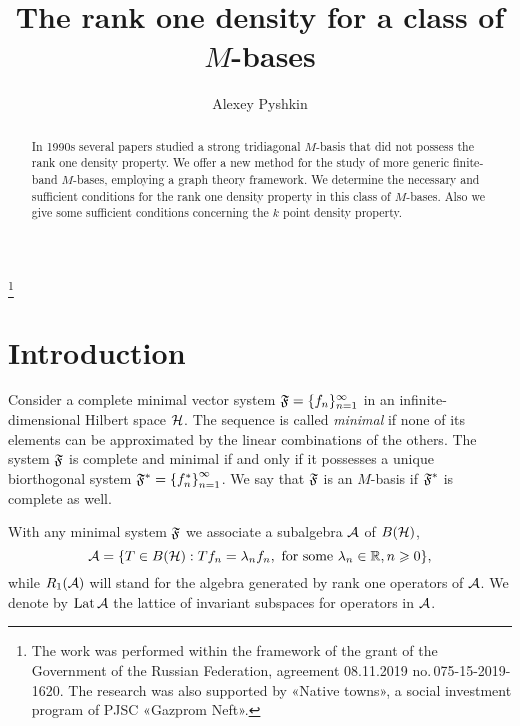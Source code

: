 \documentclass[12pt,oneside,a4paper]{amsart}
\begin{document}
\title{The rank one density for a class of $M$-bases}
\author{Alexey Pyshkin}
\address{Chebyshev Laboratory, Saint Petersburg State University, 14th Line V.O. 29, Saint Petersburg 199178, Russia}
\address{Saint Petersburg Department of RAS, Steklov Math. Institute, Fontanka 27, Saint Petersburg 191023, Russia}
\address{Euler International Mathematical Institute, nab.\,Pesochnaya 10, Saint Petersburg 197022, Russia}


\begin{abstract}
  In 1990s several papers studied a strong tridiagonal $M$-basis
    that did not possess the rank one density property.
  We offer a new method for the study of more generic finite-band $M$-bases,
    employing a graph theory framework.
  We determine the necessary and sufficient conditions for the rank one density property
    in this class of $M$-bases.
  Also we give some sufficient conditions concerning the $k$ point density property.
\end{abstract}
\thanks{
        The work was performed within the framework of the grant of the Government
          of the Russian Federation, agreement 08.11.2019 no.\,075-15-2019-1620.
        The research was also supported by «Native towns», a social investment program of PJSC «Gazprom Neft».
        }
\maketitle
\section{Introduction}
  Consider a complete minimal vector system $\fsys = \seq{f}$ in an infinite-dimensional Hilbert space $\cal{H}$.
  The sequence is called \emph{minimal} if none of its elements can be approximated by the linear combinations of the others.
  The system $\fsys$ is complete and minimal if and only if it possesses a unique biorthogonal system $\fstarsys=\left\{f_n^*\right\}_{n=1}^\infty$.
  We say that $\fsys$ is an $M$-basis if $\fstarsys$ is complete as well.

  With any minimal system $\fsys$ we associate a subalgebra $\cal{A}$ of $B(\cal{H})$,
  \[
    \cal{A} = \{T\in B(\cal{H}): Tf_n = \lambda_n f_n, \text{ for some } \lambda_n \in \mathbb{R}, n \geq 0\},
  \]
    while $R_1(\cal{A})$ will stand for the algebra generated by rank one operators of $\cal{A}$.
  We denote by $\lattice$ the lattice of invariant subspaces for operators in $\cal{A}$.
\end{document}

